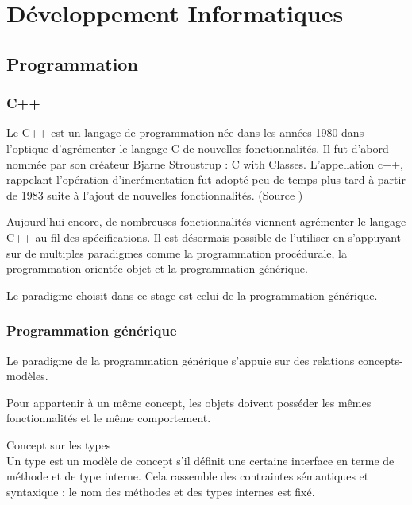 \section{Développement Informatiques}

\subsection{Programmation}

\subsubsection{C++}


Le C++ est un langage de programmation née dans les années 1980 dans l'optique d'agrémenter le langage C de nouvelles fonctionnalités. Il fut d'abord nommée par son créateur Bjarne Stroustrup : C with Classes. L’appellation c++, rappelant l'opération d'incrémentation fut adopté peu de temps plus tard à partir de 1983 suite à l'ajout de nouvelles fonctionnalités. (Source \cite{Wiki-cpp})

Aujourd'hui encore, de nombreuses fonctionnalités viennent agrémenter le langage C++ au fil des spécifications. Il est désormais possible de l'utiliser en s'appuyant sur de multiples paradigmes comme la programmation procédurale, la programmation orientée objet et la programmation générique.

Le paradigme choisit dans ce stage est celui de la programmation générique. \cite{troussil-cpp}

\subsubsection{Programmation générique}


Le paradigme de la programmation générique s'appuie sur des relations concepts-modèles. 

Pour appartenir à un même concept, les objets doivent posséder les mêmes fonctionnalités et le même comportement. 

\begin{Definition}{Concept sur les types}\\
\label{def:cpp-con}
    Un type est un modèle de concept s'il définit une certaine interface en terme de méthode et de type interne. Cela rassemble des contraintes sémantiques et syntaxique : le nom des méthodes et des types internes est fixé.
\end{Definition}

